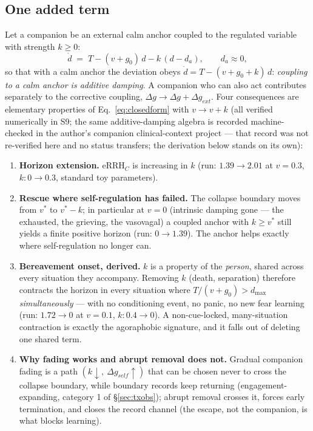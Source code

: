 \documentclass[9pt,twocolumn]{article}
\newcommand{\eRRHc}{\mathrm{eRRH}_{C}}
\begin{document}
\subsection{One added term}
Let a companion be an external calm anchor coupled to the regulated variable with strength $k\ge0$:
\begin{equation}
\dot d \;=\; T-(v+g_0)\,d-k\,(d-d_a),\qquad d_a\approx0,
\label{eq:coupling}
\end{equation}
so that with a calm anchor the deviation obeys $\dot d=T-(v+g_0+k)\,d$: \emph{coupling to a calm anchor is additive damping}. A companion who can also act contributes separately to the corrective coupling, $\Delta g\to\Delta g+\Delta g_{ext}$. Four consequences are elementary properties of Eq.~\ref{eq:closedform} with $v\to v+k$ (all verified numerically in S9; the same additive-damping algebra is recorded machine-checked in the author's companion clinical-context project \cite{lahtee2026birca} --- that record was not re-verified here and no status transfers; the derivation below stands on its own):
\begin{enumerate}[leftmargin=1.6em]
\item[P6] \textbf{Horizon extension.} $\eRRHc$ is increasing in $k$ (run: $1.39\to2.01$ at $v=0.3$, $k:0\to0.3$, standard toy parameters).
\item[P7] \textbf{Rescue where self-regulation has failed.} The collapse boundary moves from $v^{*}$ to $v^{*}-k$; in particular at $v=0$ (intrinsic damping gone --- the exhausted, the grieving, the vasovagal) a coupled anchor with $k\ge v^{*}$ still yields a finite positive horizon (run: $0\to1.39$). The anchor helps exactly where self-regulation no longer can.
\item[P8] \textbf{Bereavement onset, derived.} $k$ is a property of the \emph{person}, shared across every situation they accompany. Removing $k$ (death, separation) therefore contracts the horizon in every situation where $T/(v+g_0)>d_{\max}$ \emph{simultaneously} --- with no conditioning event, no panic, no new fear learning (run: $1.72\to0$ at $v=0.1$, $k:0.4\to0$). A non-cue-locked, many-situation contraction is exactly the agoraphobic signature, and it falls out of deleting one shared term.
\item[P9] \textbf{Why fading works and abrupt removal does not.} Gradual companion fading is a path $(k\downarrow,\ \Delta g_{self}\uparrow)$ that can be chosen never to cross the collapse boundary, while boundary records keep returning (engagement-expanding, category 1 of \S\ref{sec:txobs}); abrupt removal crosses it, forces early termination, and closes the record channel (the escape, not the companion, is what blocks learning).
\end{enumerate}
\end{document}
